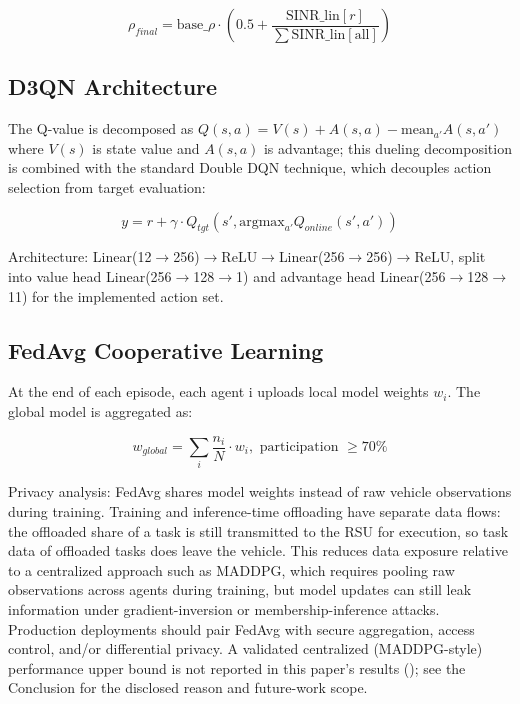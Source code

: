 \begin{equation}
\label{eq:rho_final}
\rho_{final} = \text{base\_}\rho \cdot \left(0.5 + \frac{\text{SINR\_lin}[r]}{\sum \text{SINR\_lin}[\text{all}]}\right)
\end{equation}

\subsection{D3QN Architecture}

The Q-value is decomposed as $Q(s,a) = V(s) + A(s,a) - \text{mean}_{a'} A(s,a')$ where $V(s)$ is state value and $A(s,a)$ is advantage; this dueling decomposition is combined with the standard Double DQN technique, which decouples action selection from target evaluation:

\begin{equation}
\label{eq:ddqn}
y = r + \gamma \cdot Q_{tgt}(s', \text{argmax}_{a'} Q_{online}(s', a'))
\end{equation}

\begingroup\raggedright
Architecture: Linear(12$\rightarrow$256)$\rightarrow$\allowbreak ReLU$\rightarrow$\allowbreak Linear(256$\rightarrow$256)$\rightarrow$ReLU, split into value head Linear(256$\rightarrow$128$\rightarrow$1) and advantage head Linear(256$\rightarrow$128$\rightarrow$11) for the implemented action set.
\par\endgroup

\subsection{FedAvg Cooperative Learning}

At the end of each episode, each agent i uploads local model weights $w_i$. The global model is aggregated as:

\begin{equation}
\label{eq:fedavg}
w_{global} = \sum_i \frac{n_i}{N} \cdot w_i, \text{ participation } \geq 70\%
\end{equation}

Privacy analysis: FedAvg shares model weights instead of raw vehicle observations during training. Training and inference-time offloading have separate data flows: the offloaded share of a task is still transmitted to the RSU for execution, so task data of offloaded tasks does leave the vehicle. This reduces data exposure relative to a centralized approach such as MADDPG, which requires pooling raw observations across agents during training, but model updates can still leak information under gradient-inversion or membership-inference attacks. Production deployments should pair FedAvg with secure aggregation, access control, and/or differential privacy. A validated centralized (MADDPG-style) performance upper bound is not reported in this paper's results (); see the Conclusion for the disclosed reason and future-work scope.




